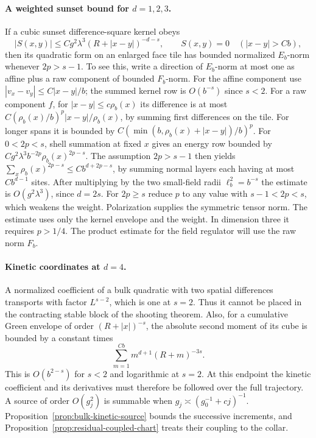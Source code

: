 \documentclass[11pt]{article}
\theoremstyle{definition}
\begin{document}
\paragraph{A weighted sunset bound for \(d=1,2,3\).}
If a cubic sunset difference-square kernel obeys
\begin{equation}
 |S(x,y)|\le Cg^2\lambda^3(R+|x-y|)^{-d-s},
 \qquad S(x,y)=0\quad (|x-y|>Cb),
\end{equation}
then its quadratic form on an enlarged face tile has bounded
normalized \(E_b\)-norm whenever \(2p>s-1\). To see this, write a
direction of \(E_b\)-norm at most one as affine plus a raw
component of bounded \(F_b\)-norm. For the affine component use
\(|v_x-v_y|\le C |x-y|/b\); the summed kernel row is \(O(b^{-s})\)
since \(s<2\). For a raw component \(f\), for
\(|x-y|\le c\rho_b(x)\) its difference is at most
\(C(\rho_b(x)/b)^p |x-y|/\rho_b(x)\), by summing first
differences on the tile. For longer spans it is bounded by
\(C(\min(b,\rho_b(x)+|x-y|)/b)^p\).
For \(0<2p<s\), shell summation at fixed \(x\) gives an energy
row bounded by \(C g^2\lambda^3 b^{-2p}\rho_b(x)^{2p-s}\).
The assumption \(2p>s-1\) then yields
\(\sum_x \rho_b(x)^{2p-s}\le C b^{d+2p-s}\), by summing
normal layers each having at most \(Cb^{d-1}\) sites.
After multiplying by the two small-field radii
\(\ell_b^2=b^{-s}\) the estimate is \(O(g^2\lambda^3)\), since
\(d=2s\). For \(2p\ge s\) reduce \(p\) to any value with
\(s-1<2p<s\), which weakens the weight. Polarization supplies
the symmetric tensor norm. The estimate uses only the kernel
envelope and the weight. In dimension three it requires
\(p>1/4\). The product estimate for the field regulator will use
the raw norm \(F_b\).

\paragraph{Kinetic coordinates at \(d=4\).}
A normalized coefficient of a bulk quadratic with two spatial
differences transports with factor \(L^{s-2}\), which is one
at \(s=2\). Thus it cannot be placed in the contracting stable
block of the shooting theorem. Also, for a cumulative
Green envelope of order \((R+|x|)^{-s}\), the absolute second
moment of its cube is bounded by a constant times
\begin{equation}
 \sum_{m=1}^{Cb} m^{d+1}(R+m)^{-3s}.
\end{equation}
This is \(O(b^{2-s})\) for \(s<2\) and logarithmic at \(s=2\).
At this endpoint the kinetic coefficient and its derivatives must
therefore be followed over the full trajectory. A source
of order \(O(g_j^2)\) is summable when
\(g_j\asymp (g_0^{-1}+c j)^{-1}\).
Proposition~\ref{prop:bulk-kinetic-source} bounds the successive
increments, and Proposition~\ref{prop:residual-coupled-chart}
treats their coupling to the collar.
\end{document}
